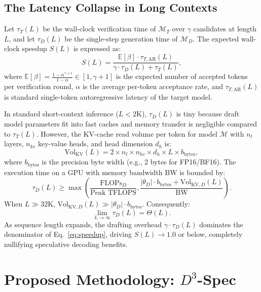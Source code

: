 \documentclass[runningheads]{llncs}
\begin{document}
\subsection{The Latency Collapse in Long Contexts}
Let $\tau_T(L)$ be the wall-clock verification time of $\mathcal{M}_T$ over $\gamma$ candidates at length $L$, and let $\tau_D(L)$ be the single-step generation time of $\mathcal{M}_D$. The expected wall-clock speedup $S(L)$ is expressed as:
\begin{equation}
    S(L) = \frac{\mathbb{E}[\beta] \cdot \tau_{T, \text{AR}}(L)}{\gamma \cdot \tau_D(L) + \tau_T(L)},
    \label{eq:speedup}
\end{equation}
where $\mathbb{E}[\beta] = \frac{1 - \alpha^{\gamma+1}}{1 - \alpha} \in [1, \gamma + 1]$ is the expected number of accepted tokens per verification round, $\alpha$ is the average per-token acceptance rate, and $\tau_{T, \text{AR}}(L)$ is standard single-token autoregressive latency of the target model.

In standard short-context inference ($L < 2\text{K}$), $\tau_D(L)$ is tiny because draft model parameters fit into fast caches and memory transfer is negligible compared to $\tau_T(L)$. However, the KV-cache read volume per token for model $\mathcal{M}$ with $n_l$ layers, $n_{kv}$ key-value heads, and head dimension $d_h$ is:
\begin{equation}
    \text{Vol}_{\text{KV}}(L) = 2 \times n_l \times n_{kv} \times d_h \times L \times b_{\text{bytes}},
\end{equation}
where $b_{\text{bytes}}$ is the precision byte width (e.g., 2 bytes for FP16/BF16). The execution time on a GPU with memory bandwidth $\text{BW}$ is bounded by:
\begin{equation}
    \tau_D(L) \ge \max\left( \frac{\text{FLOPs}_D}{\text{Peak TFLOPS}}, \frac{|\theta_D| \cdot b_{\text{bytes}} + \text{Vol}_{\text{KV}, D}(L)}{\text{BW}} \right).
\end{equation}
When $L \gg 32\text{K}$, $\text{Vol}_{\text{KV}, D}(L) \gg |\theta_D| \cdot b_{\text{bytes}}$. Consequently:
\begin{equation}
    \lim_{L \to \infty} \tau_D(L) = \Theta(L).
\end{equation}
As sequence length expands, the drafting overhead $\gamma \cdot \tau_D(L)$ dominates the denominator of Eq.~\eqref{eq:speedup}, driving $S(L) \to 1.0$ or below, completely nullifying speculative decoding benefits.

\section{Proposed Methodology: $D^3$-Spec}
\label{sec:methodology}
\end{document}
